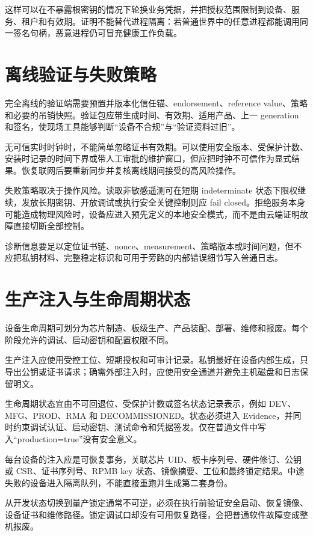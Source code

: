 这样可以在不暴露根密钥的情况下轮换业务凭据，并把授权范围限制到设备、服务、租户和有效期。证明不能替代进程隔离：若普通世界中的任意进程都能调用同一签名句柄，恶意进程仍可冒充健康工作负载。

\section{离线验证与失败策略}

完全离线的验证端需要预置并版本化信任锚、endorsement、reference value、策略和必要的吊销快照。验证包应带生成时间、有效期、适用产品、上一 generation 和签名，使现场工具能够判断“设备不合规”与“验证资料过旧”。

无可信实时时钟时，不能简单忽略证书有效期。可以使用安全版本、受保护计数、安装时记录的时间下界或带人工审批的维护窗口，但应把时钟不可信作为显式结果。恢复联网后要重新同步并复核离线期间接受的高风险操作。

失败策略取决于操作风险。读取非敏感遥测可在短期 indeterminate 状态下限权继续，发放长期密钥、开放调试或执行安全关键控制则应 fail closed。拒绝服务本身可能造成物理风险时，设备应进入预先定义的本地安全模式，而不是由云端证明故障直接切断全部控制。

诊断信息要足以定位证书链、nonce、measurement、策略版本或时间问题，但不应把私钥材料、完整稳定标识和可用于旁路的内部错误细节写入普通日志。

\section{生产注入与生命周期状态}

设备生命周期可划分为芯片制造、板级生产、产品装配、部署、维修和报废。每个阶段允许的调试、启动密钥和配置权限不同。

生产注入应使用受控工位、短期授权和可审计记录。私钥最好在设备内部生成，只导出公钥或证书请求；确需外部注入时，应使用安全通道并避免主机磁盘和日志保留明文。

生命周期状态宜由不可回退位、受保护计数或签名状态记录表示，例如 DEV、MFG、PROD、RMA 和 DECOMMISSIONED。状态必须进入 Evidence，并同时约束调试认证、启动密钥、测试命令和凭据签发。仅在普通文件中写入“production=true”没有安全意义。

每台设备的注入应是可恢复事务，关联芯片 UID、板卡序列号、硬件修订、公钥或 CSR、证书序列号、RPMB key 状态、镜像摘要、工位和最终锁定结果。中途失败的设备进入隔离队列，不能直接重跑并生成第二套身份。

从开发状态切换到量产锁定通常不可逆，必须在执行前验证安全启动、恢复镜像、设备证书和维修路径。锁定调试口却没有可用恢复路径，会把普通软件故障变成整机报废。

